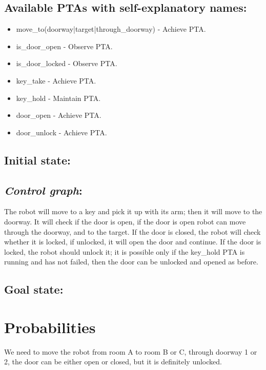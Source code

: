 \subsection{Available PTAs with self-explanatory names:}
\begin{itemize}
\item move_to(doorway|target|through_doorway) - Achieve PTA.
\item is_door_open - Observe PTA.
\item is_door_locked - Observe PTA.
\item key_take - Achieve PTA.
\item key_hold - Maintain PTA.
\item door_open - Achieve PTA.
\item door_unlock - Achieve PTA.
\end{itemize}
\subsection{Initial state: }
 \clearpage
\subsection{\textit{Control graph}:}
The robot will move to a key and pick it up with its arm; then it will move to the doorway. It will check if the door is open, if the door is open robot can move through the doorway, and to the target. If the door is closed, the robot will check whether it is locked, if unlocked, it will open the door and continue. If the door is locked, the robot should unlock it; it is possible only if the key_hold PTA is running and has not failed, then the door can be unlocked and opened as before.  \subsection{Goal state: }
 \section{Probabilities}
We need to move the robot from room A to room B or C, through doorway 1 or 2, the door can be either open or closed, but it is definitely unlocked. \\
